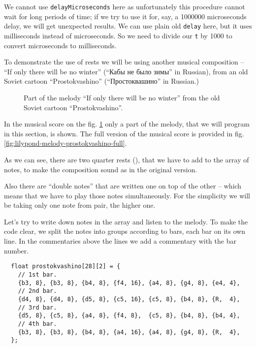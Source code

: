 \documentclass[../sparc.tex]{subfiles}
\begin{document}
We cannot use \texttt{delayMicroseconds} here as unfortunately this procedure
cannot wait for long periods of time; if we try to use it for, say, a 1000000
microseconds delay, we will get unexpected results.  We can use plain old
\texttt{delay} here, but it uses milliseconds instead of microseconds.  So we
need to divide our \texttt{t} by 1000 to convert microseconds to milliseconds.

To demonstrate the use of rests we will be using another musical composition --
``If only there will be no winter'' (``Кабы не было зимы'' in Russian), from an
old Soviet cartoon ``Prostokvashino'' (``Простоквашино'' in Russian.)

\begin{figure}[ht]
  \caption{Part of the melody ``If only there will be no winter'' from the old
    Soviet cartoon ``Prostokvashino''.}
  \label{fig:lilypond-melody-prostokvashino}
\end{figure}

In the musical score on the fig. \ref{fig:lilypond-melody-prostokvashino} only a
part of the melody, that we will program in this section, is shown.  The full
version of the musical score is provided in
fig. \ref{fig:lilypond-melody-prostokvashino-full}.

As we can see, there are two quarter rests (\crotchetRest), that we have to add
to the array of notes, to make the composition sound as in the original version.

Also there are ``double notes'' that are written one on top of the other -- which
means that we have to play those notes simultaneously.  For the simplicity we
will be taking only one note from pair, the higher one.

Let's try to write down notes in the array and listen to the melody.  To make
the code clear, we split the notes into groups according to bars, each bar on
its own line.  In the commentaries above the lines we add a commentary with the
bar number.

\begin{verbatim}
  float prostokvashino[28][2] = {
    // 1st bar.
    {b3, 8}, {b3, 8}, {b4, 8}, {f4, 16}, {a4, 8}, {g4, 8}, {e4, 4},
    // 2nd bar.
    {d4, 8}, {d4, 8}, {d5, 8}, {c5, 16}, {c5, 8}, {b4, 8}, {R,  4},
    // 3rd bar.
    {d5, 8}, {c5, 8}, {a4, 8}, {f4, 8},  {c5, 8}, {b4, 8}, {b4, 4},
    // 4th bar.
    {b3, 8}, {b3, 8}, {b4, 8}, {a4, 16}, {a4, 8}, {g4, 8}, {R,  4},
  };
\end{verbatim}
\end{document}
